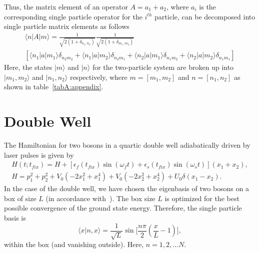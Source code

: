 Thus, the matrix element of an operator $A=a_1+a_2$, where $a_i$ is the corresponding single particle operator for the $i^{th}$ particle,  can be decomposed into single particle matrix elements as follows
\begin{multline}
\langle n | A| m \rangle =\frac{1}{\sqrt{2(1+\delta_{n_1,n_2})}} \frac{1}{\sqrt{2(1+\delta_{m_1,m_2})}}\\
  \left[ \langle n_1|a|m_1\rangle \delta_{n_2 m_2} +  \langle n_1|a|m_2\rangle \delta_{n_2 m_1}+ 
  \langle n_2|a|m_1\rangle \delta_{n_1 m_2}+\langle n_2|a|m_2\rangle \delta_{n_1 m_1} \right]
\end{multline}
Here, the states $|m\rangle$ and $|n\rangle$ for the two-particle system are broken up into $|m_1,m_2\rangle$ and $|n_1,n_2\rangle$ respectively, where $m=\left[m_1,m_2\right]$ and $n=\left[ n_1,n_2\right]$ as shown in table~\ref{tabA:appendix}.
\section{Double Well}
The Hamiltonian for two bosons in a quartic double well adiabatically driven by laser pulses  is given by
\begin{eqnarray}
H(t;t_{fix})=H+\left[\epsilon_f(t_{fix})\sin(\omega_ft)+\epsilon_s(t_{fix})\sin(\omega_st)\right](x_1+x_2),\\
H =p^2_1+p^2_2+V_0 (-2 x_1^2+ x_1^4) +V_0 (-2 x_2^2+ x_2^4)+U_0 \delta(x_1-x_2).
\label{eq:fullham:appendix}
\end{eqnarray}
In the case of the double well, we have chosen the eigenbasis of two bosons on a box of size $L$ (in accordance with~\cite{na-reichl:pbox}). The box size $L$ is optimized for the best possible convergence of the ground state energy. Therefore, the single particle basis is
\begin{equation}
\langle x|n,x\rangle=\frac{1}{\sqrt{L}} \sin{\biggl[}{\frac{n\pi}{2}(\frac{x}{L}-1){\biggr]}},
\label{eq:pboxfn:appendix}
\end{equation}
%
within the box (and vanishing outside). Here, $n=1,2,...N$. 

